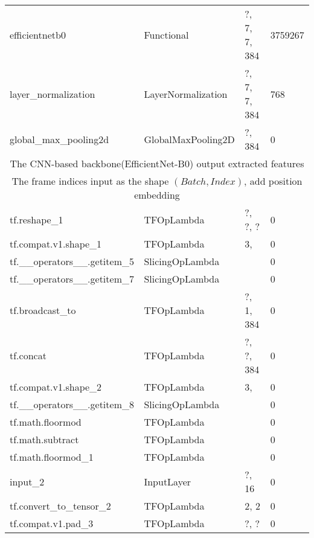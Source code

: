 \begin{longtable}{llll}
            efficientnetb0 &         Functional &                        ?, 7, 7, 384 &  3759267 \\
        layer\_normalization & LayerNormalization &                        ?, 7, 7, 384 &      768 \\
       global\_max\_pooling2d & GlobalMaxPooling2D &                              ?, 384 &        0 \\
\midrule
\multicolumn{4}{c}{The CNN-based backbone(EfficientNet-B0) output extracted features} \\
\multicolumn{4}{c}{The frame indices input as the shape $(Batch, Index)$, add position embedding} \\ \midrule
              tf.reshape\_1 &         TFOpLambda &                       ?, ?, ? &        0 \\
       tf.compat.v1.shape\_1 &         TFOpLambda &                                     3, &        0 \\
 tf.\_\_operators\_\_.getitem\_5 &    SlicingOpLambda &                                        &        0 \\
 tf.\_\_operators\_\_.getitem\_7 &    SlicingOpLambda &                                        &        0 \\
            tf.broadcast\_to &         TFOpLambda &                           ?, 1, 384 &        0 \\
                  tf.concat &         TFOpLambda &                        ?, ?, 384 &        0 \\
       tf.compat.v1.shape\_2 &         TFOpLambda &                                     3, &        0 \\
 tf.\_\_operators\_\_.getitem\_8 &    SlicingOpLambda &                                        &        0 \\
           tf.math.floormod &         TFOpLambda &                                        &        0 \\
           tf.math.subtract &         TFOpLambda &                                        &        0 \\
         tf.math.floormod\_1 &         TFOpLambda &                                        &        0 \\
                    input\_2 &         InputLayer &                             ?, 16 &        0 \\
     tf.convert\_to\_tensor\_2 &         TFOpLambda &                                   2, 2 &        0 \\
         tf.compat.v1.pad\_3 &         TFOpLambda &                             ?, ? &        0 \\

\end{longtable}
